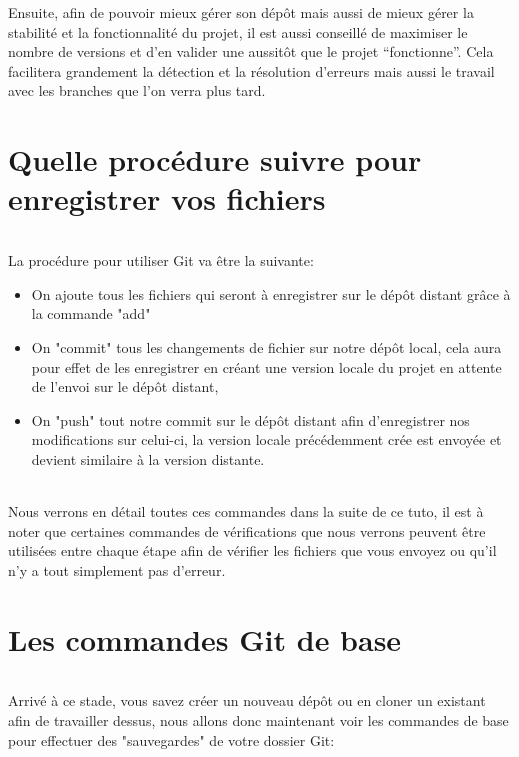 \documentclass[french, a4paper, 12pt, titlepage]{article}
\begin{document}
Ensuite, afin de pouvoir mieux gérer son dépôt mais aussi de mieux gérer la stabilité et la fonctionnalité du projet, il est aussi conseillé de maximiser le nombre de versions et d'en valider une aussitôt que le projet ``fonctionne''. Cela facilitera grandement la détection et la résolution d'erreurs mais aussi le travail avec les branches que l'on verra plus tard.


\newpage
\part{Quelle procédure suivre pour enregistrer vos fichiers}
\paragraph{}La procédure pour utiliser Git va être la suivante:
\begin{itemize}
\item On ajoute tous les fichiers qui seront à enregistrer sur le dépôt distant grâce à la commande "add"
\item On "commit" tous les changements de fichier sur notre dépôt local, cela aura pour effet de les enregistrer en créant une version locale du projet en attente de l'envoi sur le dépôt distant,
\item On "push" tout notre commit sur le dépôt distant afin d'enregistrer nos modifications sur celui-ci, la version locale précédemment crée est envoyée et devient similaire à la version distante.
\end{itemize}

\paragraph{}Nous verrons en détail toutes ces commandes dans la suite de ce tuto, il est à noter que certaines commandes de vérifications que nous verrons peuvent être utilisées entre chaque étape afin de vérifier les fichiers que vous envoyez ou qu'il n'y a tout simplement pas d'erreur.

\newpage
\part{Les commandes Git de base}
\paragraph{}Arrivé à ce stade, vous savez créer un nouveau dépôt ou en cloner un existant afin de travailler dessus, nous allons donc maintenant voir les commandes de base pour effectuer des "sauvegardes" de votre dossier Git:
\end{document}
